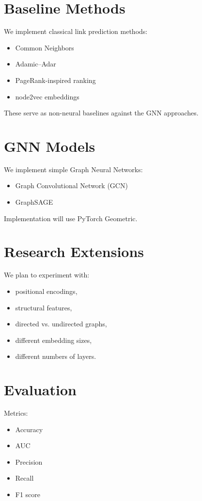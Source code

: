 \documentclass[11pt,a4paper]{article}
\begin{document}
\section{Baseline Methods}

We implement classical link prediction methods:
\begin{itemize}
\item Common Neighbors
\item Adamic--Adar
\item PageRank-inspired ranking
\item node2vec embeddings
\end{itemize}

These serve as non-neural baselines against the GNN approaches.

\section{GNN Models}

We implement simple Graph Neural Networks:
\begin{itemize}
\item Graph Convolutional Network (GCN) \cite{kipf2017semi}
\item GraphSAGE \cite{hamilton2017inductive}
\end{itemize}

Implementation will use PyTorch Geometric.

\section{Research Extensions}

We plan to experiment with:
\begin{itemize}
\item positional encodings,
\item structural features,
\item directed vs. undirected graphs,
\item different embedding sizes,
\item different numbers of layers.
\end{itemize}

\section{Evaluation}

Metrics:
\begin{itemize}
\item Accuracy
\item AUC
\item Precision
\item Recall
\item F1 score
\end{itemize}
\end{document}
